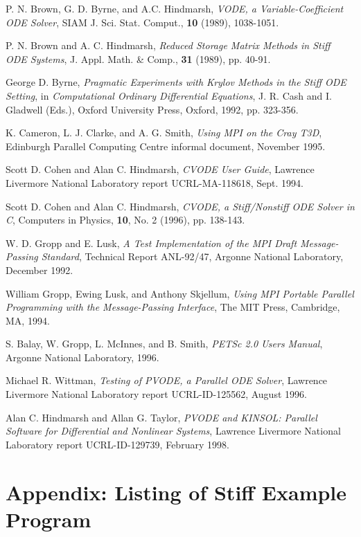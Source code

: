 \begin{thebibliography}{9}
  P. N. Brown, G. D. Byrne, and A.C. Hindmarsh, {\it VODE, a
Variable-Coefficient ODE Solver}, SIAM J. Sci. Stat. Comput., {\bf 10}
(1989), 1038-1051.

  P. N. Brown and A. C. Hindmarsh, {\it Reduced Storage
Matrix Methods in Stiff ODE Systems}, J. Appl. Math. \& Comp., {\bf 31}
(1989), pp. 40-91.

  George D. Byrne, {\it Pragmatic Experiments with Krylov
Methods in the Stiff ODE Setting}, in {\it Computational Ordinary
Differential Equations}, J. R. Cash and I. Gladwell (Eds.), Oxford
University Press, Oxford, 1992, pp. 323-356.

  K. Cameron, L. J. Clarke, and A. G. Smith, {\em Using MPI
on the Cray T3D}, Edinburgh Parallel Computing Centre informal document,
November 1995.

  Scott D. Cohen and Alan C. Hindmarsh, {\it CVODE User
Guide}, Lawrence Livermore National Laboratory report UCRL-MA-118618, Sept.
1994.

  Scott D. Cohen and Alan C. Hindmarsh, {\it CVODE, a
Stiff/Nonstiff ODE Solver in C}, Computers in Physics, {\bf 10}, No. 2
(1996), pp. 138-143.

  W. D. Gropp and E. Lusk, {\em A Test Implementation of the
MPI Draft Message-Passing Standard}, Technical Report ANL-92/47, Argonne
National Laboratory, December 1992.

  William Gropp, Ewing Lusk, and Anthony Skjellum, {\it Using
MPI Portable Parallel Programming with the Message-Passing Interface}, The
MIT Press, Cambridge, MA, 1994.

S. Balay, W. Gropp, L. McInnes, and B. Smith,
{\em PETSc 2.0 Users Manual}, Argonne National Laboratory, 1996.

  Michael R. Wittman, {\it Testing of PVODE, a Parallel ODE
Solver}, Lawrence Livermore National Laboratory report UCRL-ID-125562,
August 1996.

  Alan C. Hindmarsh and Allan G. Taylor, {\it PVODE and KINSOL:
Parallel Software for Differential and Nonlinear Systems}, Lawrence Livermore
National Laboratory report UCRL-ID-129739, February 1998.
\end{thebibliography}


\newpage
\section{Appendix: Listing of Stiff Example Program}


